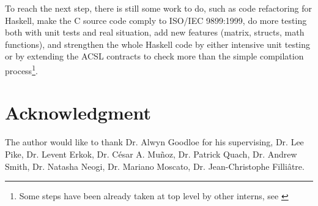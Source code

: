 \documentclass[a4paper,11pt,final]{article}
\begin{document}
	To reach the next step, there is still some work to do, such as code refactoring for Haskell, make the C source code comply to ISO/IEC 9899:1999, do more testing both with unit tests and real situation, add new features (matrix, structs, math functions), and strengthen the whole Haskell code by either intensive unit testing or by extending the ACSL contracts to check more than the simple compilation process\footnote{Some steps have been already taken at top level by other interns, see \cite{Copilot08}}.
	
	
	\cleardoublepage{}
\begin{minipage}{\textwidth}
	\footnotesize
	
	
\end{minipage}
	
	\section*{Acknowledgment}
	
	The author would like to thank Dr. Alwyn Goodloe for his supervising, Dr. Lee Pike, Dr. Levent Erkok, Dr. César A. Muñoz, Dr. Patrick Quach, Dr. Andrew Smith, Dr. Natasha Neogi, Dr. Mariano Moscato, Dr. Jean-Christophe Filliâtre.
	
	\cleardoublepage
	
\end{document}
